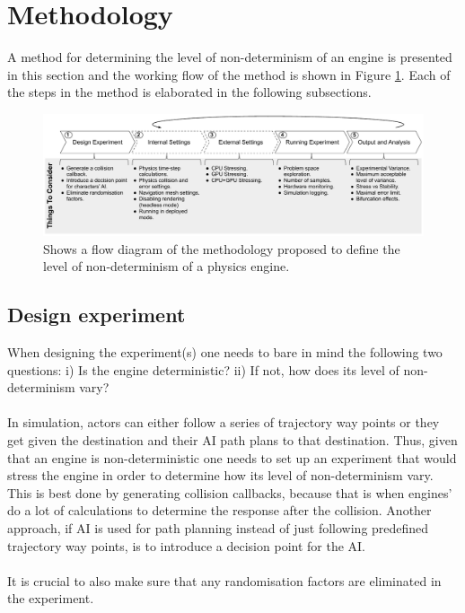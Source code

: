 \section{Methodology} \label{method}
\noindent A method for determining the level of non-determinism of an engine is presented in this section and the working flow of the method is shown in Figure \ref{method_diagram}. Each of the steps in the method is elaborated in the following subsections.
\begin{figure}[h!]
    \centering
    \includegraphics[width=0.99\linewidth]{Other/Figures/MethodologyDiagramCropped.pdf}
    \caption{Shows a flow diagram of the methodology proposed to define the level of non-determinism of a physics engine.}

    \label{method_diagram}
\end{figure}
\subsection{Design experiment}
\noindent When designing the experiment(s) one needs to bare in mind the following two questions: i) Is the engine deterministic? ii) If not, how does its level of non-determinism vary?\\\\
In simulation, actors can either follow a series of trajectory way points or they get given the destination and their AI path plans to that destination. 
Thus, given that an engine is non-deterministic one needs to set up an experiment that would stress the engine in order to determine how its level of non-determinism vary. This is best done by generating collision callbacks, because that is when engines' do a lot of calculations to determine the response after the collision. Another approach, if AI is used for path planning instead of just following predefined trajectory way points, is to introduce a decision point for the AI.\\\\
It is crucial to also make sure that any randomisation factors are eliminated in the experiment.

